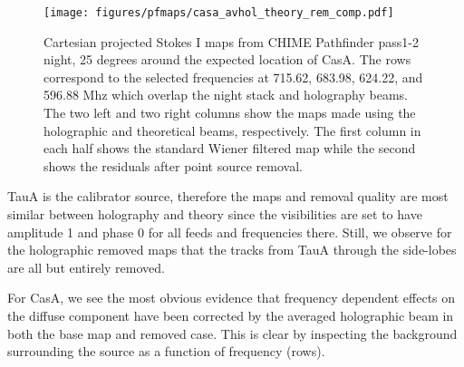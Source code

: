\begin{figure}
\centering
\texttt{[image: figures/pfmaps/casa\_avhol\_theory\_rem\_comp.pdf]}
\caption{Cartesian projected Stokes I maps from CHIME Pathfinder pass1-2 night, 25 degrees around the expected location of CasA. The rows correspond to the selected frequencies at 715.62, 683.98, 624.22, and 596.88 Mhz which overlap the night stack and holography beams. The two left and two right columns show the maps made using the holographic and theoretical beams, respectively. The first column in each half shows the standard Wiener filtered map while the second shows the residuals after point source removal.}
\label{casa_comparison}
\end{figure}

TauA is the calibrator source, therefore the maps and removal quality are most similar between holography and theory since the visibilities are set to have amplitude 1 and phase 0 for all feeds and frequencies there. Still, we observe for the holographic removed maps that the tracks from TauA through the side-lobes are all but entirely removed.

For CasA, we see the most obvious evidence that frequency dependent effects on the diffuse component have been corrected by the averaged holographic beam in both the base map and removed case. This is clear by inspecting the background surrounding the source as a function of frequency (rows).
